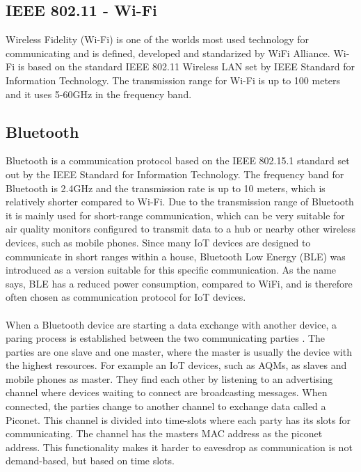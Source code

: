 \subsection{IEEE 802.11 - Wi-Fi}
Wireless Fidelity (Wi-Fi) \cite{WiFiAlliance} is one of the worlds most used technology for communicating and is defined, developed and standarized by WiFi Alliance. \cite{WiFiAlliance} Wi-Fi is based on the standard IEEE 802.11 Wireless LAN set by IEEE Standard for Information Technology. \cite{WifiStandard} The transmission range for Wi-Fi is up to 100 meters and it uses 5-60GHz in the frequency band. \cite{IAQMonitorCommunicationReview}

\subsection{Bluetooth}
Bluetooth is a communication protocol based on the IEEE 802.15.1 standard set out by the IEEE Standard for Information Technology. The frequency band for Bluetooth is 2.4GHz and the transmission rate is up to 10 meters, which is relatively shorter compared to Wi-Fi. \cite{IAQMonitorCommunicationReview} Due to the transmission range of Bluetooth it is mainly used for short-range communication, which can be very suitable for air quality monitors configured to transmit data to a hub or nearby other wireless devices, such as mobile phones. Since many IoT devices are designed to communicate in short ranges within a house, Bluetooth Low Energy (BLE) was introduced as a version suitable for this specific communication. \cite{SecurityofCommunicationProt} As the name says, BLE has a reduced power consumption, compared to WiFi, and is therefore often chosen as communication protocol for IoT devices. 
\\\\
When a Bluetooth device are starting a data exchange with another device, a paring process is established between the two communicating parties \cite{BluetoothCommunication}. The parties are one slave and one master, where the master is usually the device with the highest resources. For example an IoT devices, such as AQMs, as slaves and mobile phones as master. They find each other by listening to an advertising channel where devices waiting to connect are broadcasting messages. When connected, the parties change to another channel to exchange data called a Piconet. This channel is divided into time-slots where each party has its slots for communicating. The channel has the masters MAC address as the piconet address. This functionality makes it harder to eavesdrop as communication is not demand-based, but based on time slots. 

